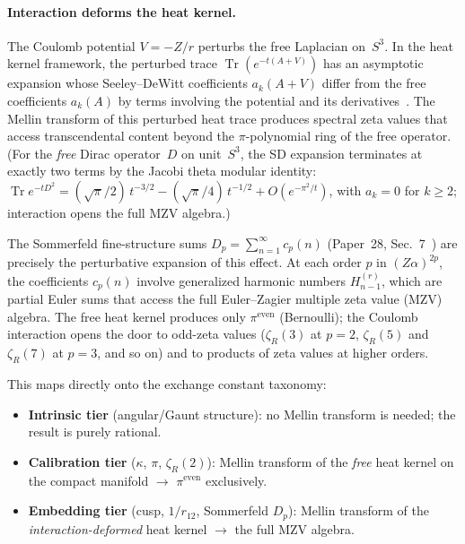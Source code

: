 \documentclass[aps,pra,twocolumn,superscriptaddress,longbibliography]{revtex4-2}
\begin{document}
\paragraph{Interaction deforms the heat kernel.}
The Coulomb potential $V = -Z/r$ perturbs the free Laplacian on~$S^3$.
In the heat kernel framework, the perturbed trace
$\operatorname{Tr}(e^{-t(A + V)})$ has an asymptotic expansion whose
Seeley--DeWitt coefficients $a_k(A + V)$ differ from the free
coefficients $a_k(A)$ by terms involving the potential and its
derivatives~\cite{gilkey1975}.  The Mellin transform of this perturbed
heat trace produces spectral zeta values that access transcendental
content beyond the $\pi$-polynomial ring of the free operator.
(For the \emph{free} Dirac operator~$D$ on unit~$S^3$, the SD
expansion terminates at exactly two terms by the Jacobi theta modular
identity: $\operatorname{Tr} e^{-tD^2}
= (\sqrt{\pi}/2)\,t^{-3/2} - (\sqrt{\pi}/4)\,t^{-1/2}
+ O(e^{-\pi^2/t})$, with $a_k = 0$ for $k \geq 2$; interaction opens
the full MZV algebra.)

The Sommerfeld fine-structure sums $D_p = \sum_{n=1}^\infty c_p(n)$
(Paper~28, Sec.~7~\cite{loutey_paper28}) are precisely the
perturbative expansion of this effect.  At each order $p$ in
$(Z\alpha)^{2p}$, the coefficients $c_p(n)$ involve generalized
harmonic numbers $H_{n-1}^{(r)}$, which are partial Euler sums that
access the full Euler--Zagier multiple zeta value (MZV) algebra.  The
free heat kernel produces only $\pi^{\text{even}}$ (Bernoulli); the
Coulomb interaction opens the door to odd-zeta values ($\zeta_R(3)$
at $p = 2$, $\zeta_R(5)$ and $\zeta_R(7)$ at $p = 3$, and so on)
and to products of zeta values at higher orders.

This maps directly onto the exchange constant taxonomy:
\begin{itemize}
  \item \textbf{Intrinsic tier} (angular/Gaunt structure): no Mellin
    transform is needed; the result is purely rational.
  \item \textbf{Calibration tier} ($\kappa$, $\pi$, $\zeta_R(2)$):
    Mellin transform of the \emph{free} heat kernel on the compact
    manifold $\to$ $\pi^{\text{even}}$ exclusively.
  \item \textbf{Embedding tier} (cusp, $1/r_{12}$, Sommerfeld $D_p$):
    Mellin transform of the \emph{interaction-deformed} heat kernel
    $\to$ the full MZV algebra.
\end{itemize}
\end{document}
